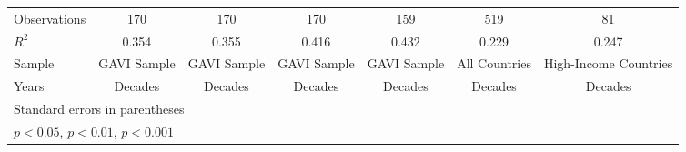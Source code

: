 \begin{table}[htbp]
\begin{tabular}{l*{6}{c}}
\midrule
Observations    &      170         &      170         &      170         &      159         &      519         &       81         \\
\(R^{2}\)       &    0.354         &    0.355         &    0.416         &    0.432         &    0.229         &    0.247         \\
Sample          &GAVI Sample         &GAVI Sample         &GAVI Sample         &GAVI Sample         &All Countries         &High-Income Countries         \\
Years           &  Decades         &  Decades         &  Decades         &  Decades         &  Decades         &  Decades         \\
\bottomrule
\multicolumn{7}{l}{\footnotesize Standard errors in parentheses}\\
\multicolumn{7}{l}{\footnotesize \sym{*} \(p<0.05\), \sym{**} \(p<0.01\), \sym{***} \(p<0.001\)}\\
\end{tabular}
\end{table}
